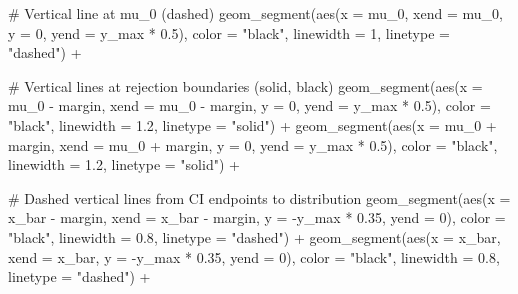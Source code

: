 \documentclass[
  letterpaper,
  DIV=11,
  numbers=noendperiod]{scrreprt}
\newenvironment{Shaded}{\begin{snugshade}}{\end{snugshade}}
\newcommand{\AttributeTok}[1]{\textcolor[rgb]{0.40,0.45,0.13}{#1}}
\newcommand{\CommentTok}[1]{\textcolor[rgb]{0.37,0.37,0.37}{#1}}
\newcommand{\DecValTok}[1]{\textcolor[rgb]{0.68,0.00,0.00}{#1}}
\newcommand{\FloatTok}[1]{\textcolor[rgb]{0.68,0.00,0.00}{#1}}
\newcommand{\FunctionTok}[1]{\textcolor[rgb]{0.28,0.35,0.67}{#1}}
\newcommand{\NormalTok}[1]{\textcolor[rgb]{0.00,0.23,0.31}{#1}}
\newcommand{\SpecialCharTok}[1]{\textcolor[rgb]{0.37,0.37,0.37}{#1}}
\newcommand{\StringTok}[1]{\textcolor[rgb]{0.13,0.47,0.30}{#1}}
\begin{document}
\begin{Shaded}
\begin{Highlighting}[]
  \CommentTok{\# Vertical line at mu\_0 (dashed)}
  \FunctionTok{geom\_segment}\NormalTok{(}\FunctionTok{aes}\NormalTok{(}\AttributeTok{x =}\NormalTok{ mu\_0, }\AttributeTok{xend =}\NormalTok{ mu\_0, }\AttributeTok{y =} \DecValTok{0}\NormalTok{, }\AttributeTok{yend =}\NormalTok{ y\_max }\SpecialCharTok{*} \FloatTok{0.5}\NormalTok{),}
               \AttributeTok{color =} \StringTok{"black"}\NormalTok{, }\AttributeTok{linewidth =} \DecValTok{1}\NormalTok{, }\AttributeTok{linetype =} \StringTok{"dashed"}\NormalTok{) }\SpecialCharTok{+}
  
  \CommentTok{\# Vertical lines at rejection boundaries (solid, black)}
  \FunctionTok{geom\_segment}\NormalTok{(}\FunctionTok{aes}\NormalTok{(}\AttributeTok{x =}\NormalTok{ mu\_0 }\SpecialCharTok{{-}}\NormalTok{ margin, }\AttributeTok{xend =}\NormalTok{ mu\_0 }\SpecialCharTok{{-}}\NormalTok{ margin, }
                   \AttributeTok{y =} \DecValTok{0}\NormalTok{, }\AttributeTok{yend =}\NormalTok{ y\_max }\SpecialCharTok{*} \FloatTok{0.5}\NormalTok{),}
               \AttributeTok{color =} \StringTok{"black"}\NormalTok{, }\AttributeTok{linewidth =} \FloatTok{1.2}\NormalTok{, }\AttributeTok{linetype =} \StringTok{"solid"}\NormalTok{) }\SpecialCharTok{+}
  \FunctionTok{geom\_segment}\NormalTok{(}\FunctionTok{aes}\NormalTok{(}\AttributeTok{x =}\NormalTok{ mu\_0 }\SpecialCharTok{+}\NormalTok{ margin, }\AttributeTok{xend =}\NormalTok{ mu\_0 }\SpecialCharTok{+}\NormalTok{ margin, }
                   \AttributeTok{y =} \DecValTok{0}\NormalTok{, }\AttributeTok{yend =}\NormalTok{ y\_max }\SpecialCharTok{*} \FloatTok{0.5}\NormalTok{),}
               \AttributeTok{color =} \StringTok{"black"}\NormalTok{, }\AttributeTok{linewidth =} \FloatTok{1.2}\NormalTok{, }\AttributeTok{linetype =} \StringTok{"solid"}\NormalTok{) }\SpecialCharTok{+}
  
  \CommentTok{\# Dashed vertical lines from CI endpoints to distribution}
  \FunctionTok{geom\_segment}\NormalTok{(}\FunctionTok{aes}\NormalTok{(}\AttributeTok{x =}\NormalTok{ x\_bar }\SpecialCharTok{{-}}\NormalTok{ margin, }\AttributeTok{xend =}\NormalTok{ x\_bar }\SpecialCharTok{{-}}\NormalTok{ margin,}
                   \AttributeTok{y =} \SpecialCharTok{{-}}\NormalTok{y\_max }\SpecialCharTok{*} \FloatTok{0.35}\NormalTok{, }\AttributeTok{yend =} \DecValTok{0}\NormalTok{),}
               \AttributeTok{color =} \StringTok{"black"}\NormalTok{, }\AttributeTok{linewidth =} \FloatTok{0.8}\NormalTok{, }\AttributeTok{linetype =} \StringTok{"dashed"}\NormalTok{) }\SpecialCharTok{+}
  \FunctionTok{geom\_segment}\NormalTok{(}\FunctionTok{aes}\NormalTok{(}\AttributeTok{x =}\NormalTok{ x\_bar, }\AttributeTok{xend =}\NormalTok{ x\_bar,}
                   \AttributeTok{y =} \SpecialCharTok{{-}}\NormalTok{y\_max }\SpecialCharTok{*} \FloatTok{0.35}\NormalTok{, }\AttributeTok{yend =} \DecValTok{0}\NormalTok{),}
               \AttributeTok{color =} \StringTok{"black"}\NormalTok{, }\AttributeTok{linewidth =} \FloatTok{0.8}\NormalTok{, }\AttributeTok{linetype =} \StringTok{"dashed"}\NormalTok{) }\SpecialCharTok{+}
  

\end{Highlighting}
\end{Shaded}
\end{document}
